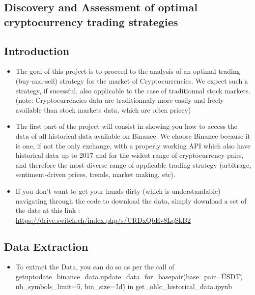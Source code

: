 \documentclass[twoside]{report}
\date{June 2021}
\begin{document}
\begin{spacing}{1}

\selectfont
\tableofcontents



\begin{abstract}

\end{abstract}


\chapter{Discovery and Assessment of optimal cryptocurrency trading strategies} 
\section{Introduction}

\begin{itemize}
    \item 
The goal of this project is to proceed to the analysis of an optimal trading (buy-and-sell) strategy for the market of Cryptocurrencies. We expect such a strategy, if sucessful, also applicable to the case of traditionnal stock markets. (note: Cryptocurrencies data are traditionnaly more easily and freely available than stock markets data, which are often pricey)
    \item
The first part of the project will consist in showing you how to access the data of all historical data available on Binance. We choose Binance because it is one, if not the only exchange, with a properly working API which also have historical data up to 2017 and for the widest range of cryptocurrency pairs, and therefore the most diverse range of applicable trading strategy (arbitrage, sentiment-driven prices, trends, market making, etc).
    \item{
If you don't want to get your hands dirty (which is understandable) navigating through the code to download the data, simply download a set of the date at this link : \url{https://drive.switch.ch/index.php/s/URDxQbEv8LqSkB2}}

\end{itemize}



\section{Data Extraction}

\begin{itemize}
\item{To extract the Data, you can do so as per the call of getuptodate\_binance\_data.update\_data\_for\_basepair(base\_pair=\'USDT\', nb\_symbols\_limit=5, bin\_size=\'1d\') in get\_ohlc\_historical\_data.ipynb}


\end{itemize}
\end{spacing}
\end{document}

